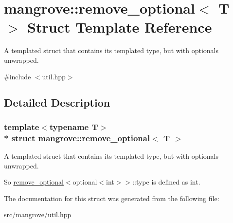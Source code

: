 \hypertarget{structmangrove_1_1remove__optional}{}\section{mangrove\+:\+:remove\+\_\+optional$<$ T $>$ Struct Template Reference}
\label{structmangrove_1_1remove__optional}


A templated struct that contains its templated type, but with optionals unwrapped.  




{\ttfamily \#include $<$util.\+hpp$>$}



\subsection{Detailed Description}
\subsubsection*{template$<$typename T$>$\\*
struct mangrove\+::remove\+\_\+optional$<$ T $>$}

A templated struct that contains its templated type, but with optionals unwrapped. 

So {\ttfamily \hyperlink{structmangrove_1_1remove__optional}{remove\+\_\+optional}$<$optional$<$int$>$$>$\+::type} is defined as {\ttfamily int}. 

The documentation for this struct was generated from the following file\+:\begin{DoxyCompactItemize}
\item 
src/mangrove/util.\+hpp\end{DoxyCompactItemize}
